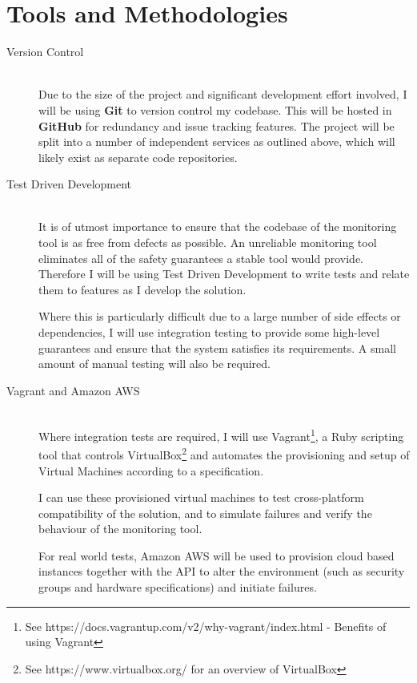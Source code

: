\documentclass{cshonours}
\begin{document}
\section{Tools and Methodologies}
\begin{description}
  \item [Version Control]\hfill \\
    Due to the size of the project and significant development effort involved, I will be using \textbf{Git} to version control my codebase. This will be hosted in \textbf{GitHub} for redundancy and issue tracking features. The project will be split into a number of independent services as outlined above, which will likely exist as separate code repositories.
  \item [Test Driven Development]\hfill \\
    It is of utmost importance to ensure that the codebase of the monitoring tool is as free from defects as possible. An unreliable monitoring tool eliminates all of the safety guarantees a stable tool would provide. Therefore I will be using Test Driven Development to write tests and relate them to features as I develop the solution.

    Where this is particularly difficult due to a large number of side effects or dependencies, I will use integration testing to provide some high-level guarantees and ensure that the system satisfies its requirements. A small amount of manual testing will also be required.
  \item [Vagrant and Amazon AWS]\hfill \\
    Where integration tests are required, I will use Vagrant\footnote{See
    https://docs.vagrantup.com/v2/why-vagrant/index.html - Benefits of using Vagrant}, a Ruby scripting tool that controls
    VirtualBox\footnote{See https://www.virtualbox.org/ for an overview of VirtualBox} and automates the provisioning and setup of Virtual Machines according to a specification.

    I can use these provisioned virtual machines to test cross-platform compatibility of the solution, and to simulate failures and verify the behaviour of the monitoring tool.

    For real world tests, Amazon AWS will be used to provision cloud based instances together with the API to alter the environment (such as security groups and hardware specifications) and initiate failures.
\end{description}

\pagebreak

\printbibliography[title=References]
% 
\end{document}
